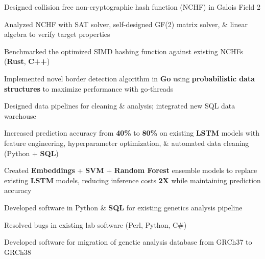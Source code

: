 \documentclass[]{chandan-cv}
\begin{document}
\begin{minipage}[t]{0.75\textwidth}
\begin{tightemize}
        \item Designed collision free non-cryptographic hash function (NCHF) in Galois Field 2
        \item Analyzed NCHF with SAT solver, self-designed GF(2) matrix solver, \& linear algebra to verify target properties
        \item Benchmarked the optimized SIMD hashing function against existing NCHFs (\textbf{Rust}, \textbf{C++})
        \item Implemented novel border detection algorithm in \textbf{Go} using \textbf{probabilistic data structures} to maximize performance with go-threads
\end{tightemize}
\sectionsep

\begin{tightemize}
        \item Designed data pipelines for cleaning \& analysis; integrated new SQL data warehouse
        \item Increased prediction accuracy from \textbf{40\%} to \textbf{80\%} on existing \textbf{LSTM} 
  models with feature engineering, hyperparameter optimization, \& automated data cleaning (Python + \textbf{SQL})
        \item Created \textbf{Embeddings} + \textbf{SVM} + \textbf{Random Forest} ensemble models to replace existing 
  \textbf{LSTM} models, reducing inference costs \textbf{2X} while maintaining prediction accuracy
\end{tightemize}
\sectionsep

\begin{tightemize}
	\item Developed software in Python \& \textbf{SQL} for existing genetics analysis pipeline 
	\item Resolved bugs in existing lab software (Perl, Python, C\#)
	\item Developed software for migration of genetic analysis database from GRCh37 to GRCh38
\end{tightemize}
\sectionsep


\end{minipage}
\end{document}
